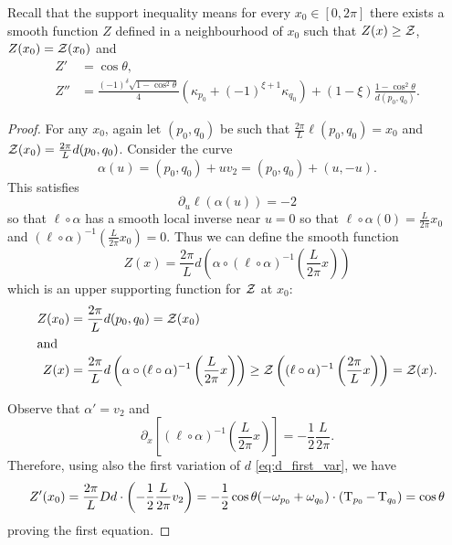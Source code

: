 \documentclass[a4paper, 12pt]{amsart}
\begin{document}
Recall that the support inequality means for every $x_0 \in [0,2\pi]$ there exists a smooth function $Z$ defined in a neighbourhood of $x_0$ such that $Z(x) \geq \operatorname{\mathcal{Z}}$, $Z(x_0) = \operatorname{\mathcal{Z}}(x_0)$ and
\begin{align*}
Z' &= \cos \theta, \\
Z'' &= \frac{(-1)^{\delta}\sqrt{1-\cos^2\theta}}{4} (\kappa_{p_0} + (-1)^{\xi+1}\kappa_{q_0}) + (1-\xi) \frac{1-\cos^2\theta}{d(p_0,q_0)}.
\end{align*}

\begin{proof}
For any $x_0$, again let $(p_0,q_0)$ be such that $\frac{2\pi}{L}\ell(p_0,q_0) = x_0$ and $\operatorname{\mathcal{Z}}(x_0) = \frac{2\pi}{L} d(p_0,q_0)$. Consider the curve
\[
\alpha(u) = (p_0, q_0) + uv_2 = (p_0, q_0) + (u,-u).
\]
This satisfies
\[
\partial_u \ell(\alpha(u)) = -2
\]
so that $\ell\circ\alpha$ has a smooth local inverse near $u=0$ so that \(\ell \circ \alpha(0) = \frac{L}{2\pi} x_0\) and \((\ell \circ \alpha)^{-1} \left(\frac{L}{2\pi} x_0\right) = 0\). Thus we can define the smooth function
\[
Z(x) = \frac{2\pi}{L} d\left(\alpha \circ (\ell\circ\alpha)^{-1} \left(\frac{L}{2\pi}x\right)\right)
\]
which is an upper supporting function for \(\operatorname{\mathcal{Z}}\) at \(x_0\):
\begin{align*}
Z(x_0) &= \frac{2\pi}{L} d(p_0, q_0) = \operatorname{\mathcal{Z}}(x_0) \\
\intertext{and}
Z(x) &= \frac{2\pi}{L} d\left(\alpha \circ (\ell\circ\alpha)^{-1} \left(\frac{L}{2\pi}x\right)\right) \geq \operatorname{\mathcal{Z}} \left((\ell\circ\alpha)^{-1} \left(\frac{2\pi}{L}x\right)\right) = \operatorname{\mathcal{Z}}(x).
\end{align*}

Observe that $\alpha' = v_2$ and
\[
\partial_x \left[(\ell\circ\alpha)^{-1} \left(\frac{L}{2\pi}x\right)\right] = -\frac{1}{2} \frac{L}{2\pi}.
\]
Therefore, using also the first variation of $d$ \eqref{eq:d_first_var}, we have
\[
Z'(x_0) = \frac{2\pi}{L} D d \cdot \left(-\frac{1}{2}\frac{L}{2\pi} v_2\right) = -\frac{1}{2} \cos\theta (-\omega_{p_0} + \omega_{q_0}) \cdot (\operatorname{T}_{p_0} - \operatorname{T}_{q_0}) = \cos\theta
\]
proving the first equation.


\end{proof}
\end{document}
